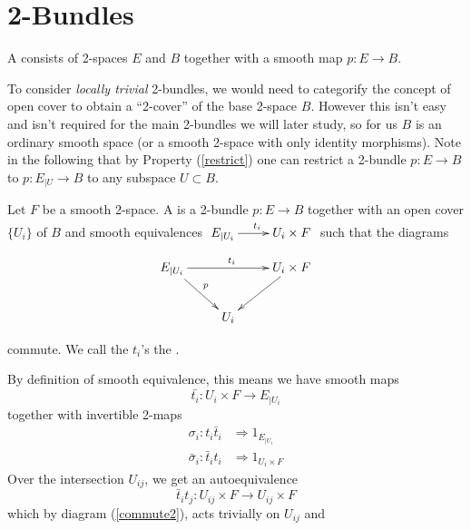 
\section{2-Bundles}

\begin{definition}
 A  consists of 2-spaces $E$ and $B$ together with a smooth map $p:E\rightarrow B$.
\end{definition}
To consider \emph{locally trivial} 2-bundles, we would need to categorify the concept of open cover to obtain a ``2-cover'' of the base 2-space $B$. However this isn't easy and isn't required for the main 2-bundles we will later study, so for us $B$ is an ordinary smooth space (or a smooth 2-space with only identity morphisms).
Note in the following that by Property (\ref{restrict}) one can restrict a 2-bundle $p:E\rightarrow B$ to $p:E_{|U}\rightarrow B$ to any subspace $U\subset B$.
\begin{definition}
 Let $F$ be a smooth 2-space. A  is a 2-bundle $p:E\rightarrow B$ together with an open cover $\{U_i\}$ of $B$ and smooth equivalences $\xymatrix{E_{|U_i}\ar[r]^{t_i} & U_i\times F}$ such that the diagrams
\begin{equation}    \label{commute2}
 \xymatrix{E_{|U_i}\ar[rr]^{t_i} \ar[dr]^{p} & & U_i\times F \ar[dl]\\
& U_i & }
\end{equation}

commute. We call the $t_i$'s the .
\end{definition}

By definition of smooth equivalence, this means we have smooth maps \[ \bar{t_i}:U_i\times F\rightarrow E_{|U_i}                                                                \]
together with invertible 2-maps \begin{align*}
                                 \sigma_i : t_i\bar{t}_i &\Rightarrow 1_{E_{|U_i}}\\
				\bar{\sigma}_i: \bar{t}_i t_i &\Rightarrow 1_{U_i\times F}
                                \end{align*}
Over the intersection $U_{ij}$, we get an autoequivalence \[ \bar{t}_i t_j:U_{ij}\times F\rightarrow U_{ij}\times F
                                                          \]
which by diagram (\ref{commute2}), acts trivially on $U_{ij}$ and

